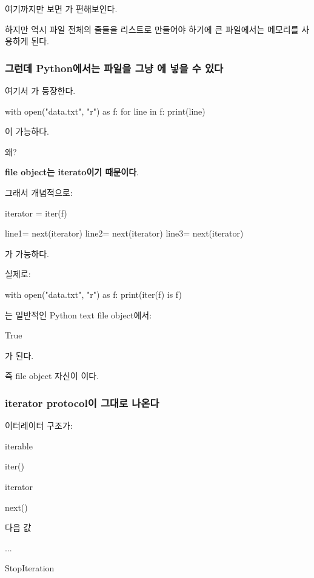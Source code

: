 여기까지만 보면 가 편해보인다.

하지만 역시 파일 전체의 줄들을 리스트로 만들어야 하기에 큰 파일에서는 메모리를 사용하게 된다.

\subsubsection{그런데 Python에서는 파일을 그냥 에 넣을 수 있다}

여기서 가 등장한다.

\begin{dhkcode}
with open("data.txt", "r") as f:
    for line in f:
        print(line)
\end{dhkcode}

이 가능하다.

왜?

\textbf{file object는 iterato이기 때문이다}.

그래서 개념적으로:

\begin{dhkcode}
iterator = iter(f)

line1= next(iterator)
line2= next(iterator)
line3= next(iterator)
\end{dhkcode}

가 가능하다.

실제로:

\begin{dhkcode}
with open("data.txt", "r") as f:
    print(iter(f) is f)
\end{dhkcode}

는 일반적인 Python text file object에서:

\begin{dhkzsh}
True
\end{dhkzsh}

가 된다.

즉 file object 자신이 이다.

\subsubsection{iterator protocol이 그대로 나온다}

이터레이터 구조가:

\begin{dhksmry}[centered]
iterable

\da

iter()

\da

iterator

\da

next()

\da

다음 값

\da

...

\da

StopIteration
\end{dhksmry}

